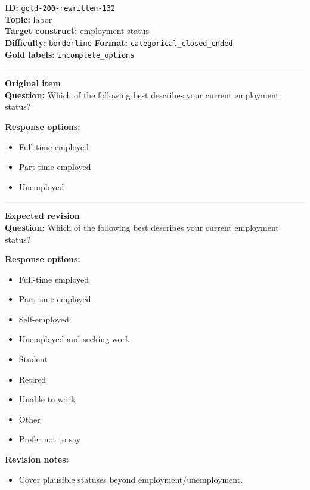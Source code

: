 \documentclass[10pt,a4paper]{article}
\newcommand{\sectionline}{\vspace{0.15em}\hrule\vspace{0.35em}}
\begin{document}
\begin{tcolorbox}[colframe=FlawRed,colback=white,colbacktitle=FlawRed!9,coltitle=black,title={Item 132\hfill Flawed item}]
\textbf{ID:} \texttt{gold-200-rewritten-132}\\
\textbf{Topic:} labor\\
\textbf{Target construct:} employment status\\
\textbf{Difficulty:} \texttt{borderline} \quad \textbf{Format:} \texttt{categorical\_closed\_ended}\\
\textbf{Gold labels:} \texttt{incomplete\_options}\\
\sectionline
\textbf{Original item}\\
\textbf{Question:} Which of the following best describes your current employment status?
\par\textbf{Response options:}
\begin{itemize}
\item Full-time employed
\item Part-time employed
\item Unemployed
\end{itemize}
\sectionline
\textbf{Expected revision}\\
\textbf{Question:} Which of the following best describes your current employment status?
\par\textbf{Response options:}
\begin{itemize}
\item Full-time employed
\item Part-time employed
\item Self-employed
\item Unemployed and seeking work
\item Student
\item Retired
\item Unable to work
\item Other
\item Prefer not to say
\end{itemize}
\par\textbf{Revision notes:}
\begin{itemize}
\item Cover plausible statuses beyond employment/unemployment.
\end{itemize}
\end{tcolorbox}
\end{document}
